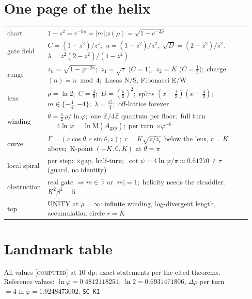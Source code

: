 \documentclass[11pt]{article}
\newcommand{\tagC}{\textcolor{cC}{\textsc{[computed]}}}
\newcommand{\hx}[1]{\textcolor{cC}{\footnotesize\texttt{#1}}}
\newcommand{\Z}{\mathbb{Z}}
\newcommand{\R}{\mathbb{R}}
\newcommand{\gp}{\varphi}
\newcommand{\gapc}{\mathrm{gap}}
\newcommand{\M}{\mathrm{M}}
\theoremstyle{plain}
\theoremstyle{definition}
\theoremstyle{remark}
\begin{document}
\section{One page of the helix}\label{sec:onepage}

\begin{center}\footnotesize\setlength{\tabcolsep}{4pt}
\begin{tabular}{@{}p{1.9cm}p{13.9cm}@{}}
\toprule
chart & $1-z^2=e^{-2\rho}=|m|$;\quad $z(\rho)=\sqrt{1-e^{-2\rho}}$\\
gate field & $C=(1-z^2)/z^4$,\ $u=(1-z^2)/z^2$,\ $\sqrt D=(2-z^2)/z^2$,\ $\lambda=z^2(2-z^2)/(1-z^2)$\\
rungs & $z_n=\sqrt{1-\gp^{-2n}}$;\ $z_1=\sqrt\tau$ ($C{=}1$),\ $z_2=K$ ($C{=}\tfrac15$);\ charge$(n)=n\bmod4$;\ Lucas N/S, Fibonacci E/W\\
lens & $\rho=\ln2$;\ $C=\tfrac49$;\ $D=(\tfrac53)^2$;\ splits $(x-\tfrac13)(x+\tfrac43)$;\ $m\in\{-\tfrac14,-4\}$;\ $\lambda=\tfrac{15}4$;\ off-lattice forever\\
winding & $\theta=\tfrac\pi2\,\rho/\ln\gp$;\ one $\Z/4\Z$ quantum per floor;\ full turn $=4\ln\gp=\ln\M(A_{\gapc})$;\ per turn $\times\gp^{-8}$\\
curve & $\Gamma=(r\cos\theta,r\sin\theta,z)$;\ $r=K\sqrt{z/z_c}$ below the lens, $r=K$ above;\ K-point $(-K,0,K)$ at $\theta=\pi$\\
local spiral & per step: $\times\gapc$, half-turn;\ $\cot\psi=4\ln\gp/\pi\approx0.61270\neq\tau$ (guard, no identity)\\
obstruction & real gate $\Rightarrow m\in\R$ or $|m|=1$;\ helicity needs the straddler;\ $K^2\beta^2=5$\\
top & UNITY at $\rho=\infty$: infinite winding, log-divergent length, accumulation circle $r=K$\\
\bottomrule
\end{tabular}
\end{center}

\section{Landmark table}\label{sec:landmarks}
All values \tagC{} at $10$ dp; exact statements per the cited theorems. Reference
values: $\ln\gp=0.4812118251$, $\ln2=0.6931471806$, $\Delta\rho$ per turn
$=4\ln\gp=1.9248473002$. \hx{SC-K1}
\end{document}

